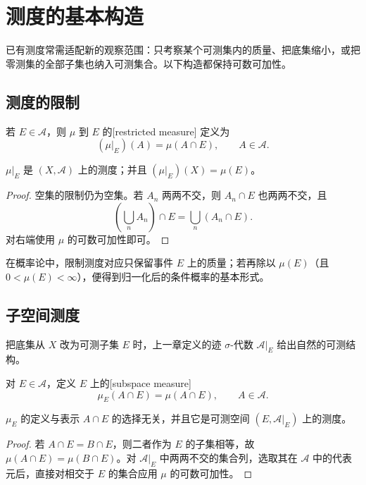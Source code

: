 \section{测度的基本构造}
\label{b1:sec:0202}

已有测度常需适配新的观察范围：只考察某个可测集内的质量、把底集缩小，或把零测集的全部子集也纳入可测集合。以下构造都保持可数可加性。

\subsection{测度的限制}
\label{b1:subsec:020201}

\begin{definition}
\label{b1:def:restriction-measure}
若 \(E\in\mathcal A\)，则 \(\mu\) 到 \(E\) 的[restricted measure] 定义为
\[
(\mu|_E)(A)=\mu(A\cap E),
\qquad A\in\mathcal A.
\]
\end{definition}

\begin{proposition}
\label{b1:prop:restriction-measure}
\(\mu|_E\) 是 \((X,\mathcal A)\) 上的测度；并且 \((\mu|_E)(X)=\mu(E)\)。
\end{proposition}
\begin{proof}
空集的限制仍为空集。若 \(A_n\) 两两不交，则 \(A_n\cap E\) 也两两不交，且
\[
\left(\bigcup_nA_n\right)\cap E=\bigcup_n(A_n\cap E).
\]
对右端使用 \(\mu\) 的可数可加性即可。
\end{proof}

在概率论中，限制测度对应只保留事件 \(E\) 上的质量；若再除以 \(\mu(E)\)（且 \(0<\mu(E)<\infty\)），便得到归一化后的条件概率的基本形式。

\subsection{子空间测度}
\label{b1:subsec:020202}

把底集从 \(X\) 改为可测子集 \(E\) 时，上一章定义的迹 \(\sigma\)-代数 \(\mathcal A|_E\) 给出自然的可测结构。

\begin{definition}
\label{b1:def:subspace-measure}
对 \(E\in\mathcal A\)，定义 \(E\) 上的[subspace measure]
\[
\mu_E(A\cap E)=\mu(A\cap E),
\qquad A\in\mathcal A.
\]
\end{definition}

\begin{proposition}
\label{b1:prop:subspace-measure}
\(\mu_E\) 的定义与表示 \(A\cap E\) 的选择无关，并且它是可测空间 \((E,\mathcal A|_E)\) 上的测度。
\end{proposition}
\begin{proof}
若 \(A\cap E=B\cap E\)，则二者作为 \(E\) 的子集相等，故 \(\mu(A\cap E)=\mu(B\cap E)\)。对 \(\mathcal A|_E\) 中两两不交的集合列，选取其在 \(\mathcal A\) 中的代表元后，直接对相交于 \(E\) 的集合应用 \(\mu\) 的可数可加性。
\end{proof}

